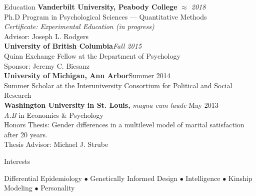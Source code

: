 \documentclass {resume}
\begin{document}
\nonfrenchspacing
\thispagestyle{myheadings}
\markright{\em{\textrm \today}}

\begin{rSection}{\textrm{Education}}
{\bf Vanderbilt University, Peabody College} \hfill  {\em $\approx$ 2018} \\
Ph.D Program in Psychological Sciences --- Quantitative Methods %
\\
\hspace* {3 mm}\textit{Certificate: Experimental Education (in progress)}\\
\hspace* {3 mm}Advisor: Joseph L. Rodgers\medskip\\
\textbf{University of British Columbia}\hfill \textit{Fall 2015}\\ 
Quinn Exchange Fellow at the Department of Psychology\\
\hspace* {3 mm} Sponsor: Jeremy C. Biesanz\medskip\\
\textbf{University of Michigan, Ann Arbor}\hfill Summer 2014\\ 
Summer Scholar at the Interuniversity Consortium for Political and Social Research\medskip\\
{\bf Washington University in St. Louis, }\textit{magna cum laude} \hfill  {May 2013} \\ 
{\em A.B} in Economics \& Psychology\\
\hspace* {3 mm}Honors Thesis: Gender differences in a multilevel model of marital satisfaction after 20 years.  \\
\hspace* {3 mm}Thesis Advisor: Michael J. Strube%

\end{rSection}
\begin{rSection}{\textrm{Interests}} \begin{center}Differential Epidemiology $\bullet$ Genetically Informed Design $\bullet$ Intelligence $\bullet$ Kinship Modeling $\bullet$ Personality\end{center}
\end{rSection}
\end{document}
